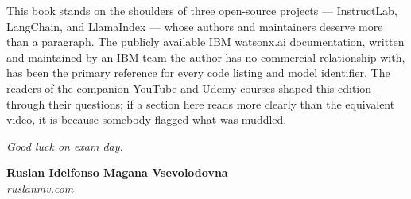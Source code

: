 This book stands on the shoulders of three open-source projects --- InstructLab, LangChain, and LlamaIndex --- whose authors and maintainers deserve more than a paragraph. The publicly available IBM watsonx.ai documentation, written and maintained by an IBM team the author has no commercial relationship with, has been the primary reference for every code listing and model identifier. The readers of the companion YouTube and Udemy courses shaped this edition through their questions; if a section here reads more clearly than the equivalent video, it is because somebody flagged what was muddled.

\vspace{1cm}

\noindent\textit{Good luck on exam day.}

\vspace{0.5cm}

\noindent\textbf{Ruslan Idelfonso Magana Vsevolodovna}\\
\textit{ruslanmv.com}

\cleardoublepage

